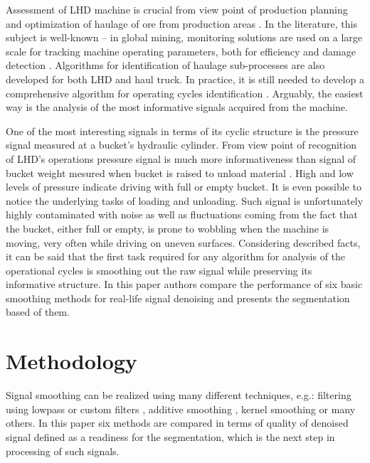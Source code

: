 \documentclass{webofc}
\begin{document}
Assessment of LHD machine is crucial from view point of production planning and optimization of haulage of ore from production areas \cite{cui2013production,gustafson2014development}. In the literature, this subject is well-known – in global mining, monitoring solutions are used on a large scale for tracking machine operating parameters, both for efficiency and damage detection \cite{wylomanska2015analysis,wylomanska2014signal,gajda2016subordinated,wodeckicondition}. Algorithms for identification of haulage sub-processes are also developed for both LHD and haul truck. In practice, it is still needed to develop a comprehensive algorithm for operating cycles identification \cite{stefaniak2015effectiveness, mpolak}. Arguably, the easiest way is the analysis of the most informative signals acquired from the machine. 

One of the most interesting signals in terms of its cyclic structure is the pressure signal measured
at a bucket’s hydraulic cylinder. From view point of recognition of LHD's operations pressure signal is much more informativeness than signal of bucket weight mesured when bucket is raised to unload material \cite{stefaniak2016multidimensional}. High and low levels of pressure indicate driving with full or empty bucket. It is even possible to notice the underlying tasks of loading and unloading. Such signal is unfortunately highly contaminated with noise as well as fluctuations coming from the fact that the bucket, either full or empty, is prone to wobbling when the machine is moving, very often while driving on uneven surfaces. Considering described facts, it can be said that the first task required for any algorithm for analysis of the operational cycles is smoothing out the raw signal while preserving its informative structure.
In this paper authors compare the performance of six basic smoothing methods for real-life signal denoising and presents the segmentation based of them.

\section{Methodology}
Signal smoothing can be realized using many different techniques, e.g.: filtering using lowpass or custom filters \cite{mitra2006digital}, additive smoothing \cite{valcarce2016additive}, kernel smoothing \cite{friedman2001elements} or many others. In this paper six methods are compared in terms of quality of denoised signal defined as a readiness for the segmentation, which is the next step in processing of such signals.
\end{document}
